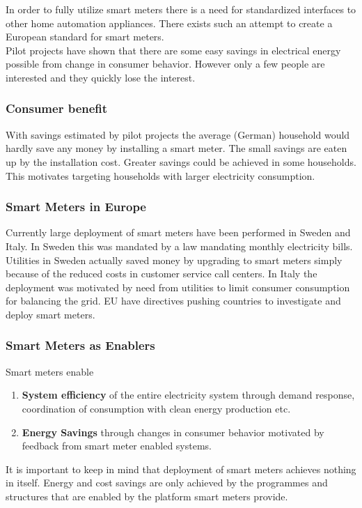 In order to fully utilize smart meters there is a need for standardized interfaces to other home automation appliances.
There exists such an attempt to create a European standard for smart meters.\\

Pilot projects have shown that there are some easy savings in electrical energy possible from change in consumer behavior.
However only a few people are interested and they quickly lose the interest.

\subsubsection{Consumer benefit}
With savings estimated by pilot projects the average (German) household would hardly save any money by installing a smart meter. The small savings are eaten up by the installation cost.
Greater savings could be achieved in some households.
This motivates targeting households with larger electricity consumption.

\subsubsection{Smart Meters in Europe}
Currently large deployment of smart meters have been performed in Sweden and Italy.
In Sweden this was mandated by a law mandating monthly electricity bills.
Utilities in Sweden actually saved money by upgrading to smart meters simply because of the reduced costs in customer service call centers.
In Italy the deployment was motivated by need from utilities to limit consumer consumption for balancing the grid.
EU have directives pushing countries to investigate and deploy smart meters.

\subsubsection{Smart Meters as Enablers}
Smart meters enable
\begin{enumerate}
    \item \textbf{System efficiency} of the entire electricity system through demand response, coordination of consumption with clean energy production etc.
    \item \textbf{Energy Savings} through changes in consumer behavior motivated by feedback from smart meter enabled systems.
\end{enumerate}

It is important to keep in mind that deployment of smart meters achieves nothing in itself.
Energy and cost savings are only achieved by the programmes and structures that are enabled by the platform smart meters provide.

